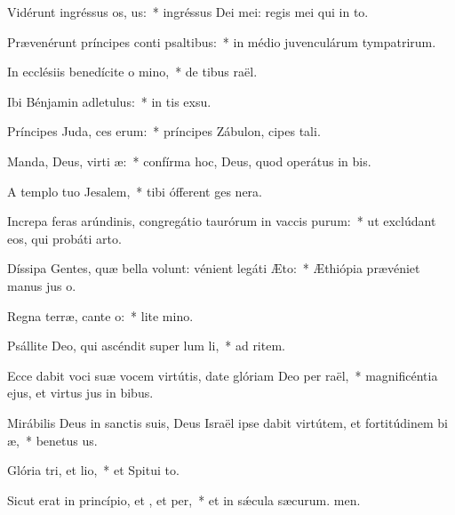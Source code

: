 \item Vidérunt ingréssus os, us:~* ingréssus Dei mei: regis mei qui  in to.
\item Prævenérunt príncipes conti psaltibus:~* in médio juvenculárum tympatrirum.
\item In ecclésiis benedícite o mino,~* de tibus raël.
\item Ibi Bénjamin adletulus:~* in tis exsu.
\item Príncipes Juda, ces erum:~* príncipes Zábulon, cipes tali.
\item Manda, Deus, virti æ:~* confírma hoc, Deus, quod operátus  in bis.
\item A templo tuo  Jesalem,~* tibi ófferent ges nera.
\item Increpa feras arúndinis, congregátio taurórum in vaccis purum:~* ut exclúdant eos, qui probáti  arto.
\item Díssipa Gentes, quæ bella volunt: vénient legáti  Æto:~* Æthiópia prævéniet manus jus o.
\item Regna terræ, cante o:~* lite mino.
\item Psállite Deo, qui ascéndit super lum li,~* ad ritem.
\item Ecce dabit voci suæ vocem virtútis, date glóriam Deo per raël,~* magnificéntia ejus, et virtus jus in bibus.
\item Mirábilis Deus in sanctis suis, Deus Israël ipse dabit virtútem, et fortitúdinem bi æ,~* benetus us.
\item Glória tri, et lio,~* et Spitui to.
\item Sicut erat in princípio, et , et per,~* et in sǽcula sæcurum. men.
